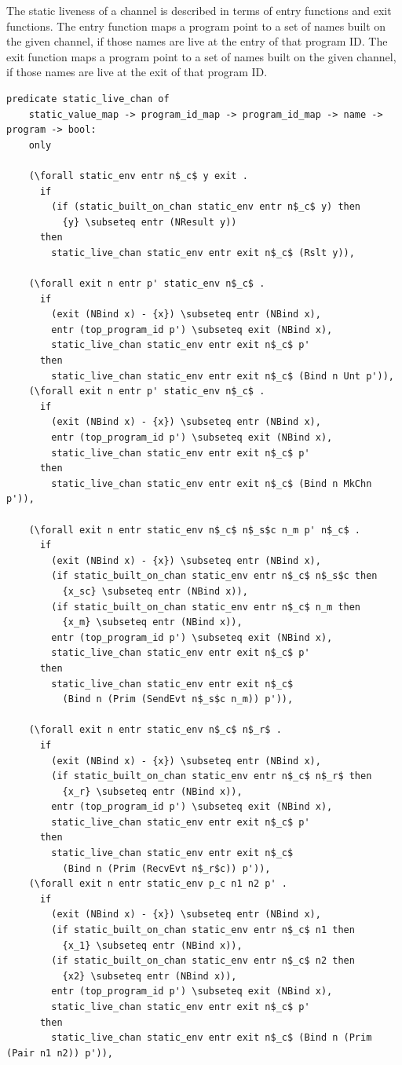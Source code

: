 \documentclass[10pt]{article}
\begin{document}
The static liveness of a channel is described in terms of entry functions and
exit functions. The entry function maps a program point to a set of names built on
the given channel, if those names are live at the entry of that program ID.
The exit function maps a program point to a
set of names built on the given channel, if those names are live at the exit of that
program ID.

\begin{lstlisting}[language=logic, mathescape]
  predicate static_live_chan of
    static_value_map -> program_id_map -> program_id_map -> name -> program -> bool:
    only

    (\forall static_env entr n$_c$ y exit .
      if
        (if (static_built_on_chan static_env entr n$_c$ y) then
          {y} \subseteq entr (NResult y))
      then
        static_live_chan static_env entr exit n$_c$ (Rslt y)),

    (\forall exit n entr p' static_env n$_c$ .
      if 
        (exit (NBind x) - {x}) \subseteq entr (NBind x),
        entr (top_program_id p') \subseteq exit (NBind x),
        static_live_chan static_env entr exit n$_c$ p'
      then 
        static_live_chan static_env entr exit n$_c$ (Bind n Unt p')),
    (\forall exit n entr p' static_env n$_c$ .
      if
        (exit (NBind x) - {x}) \subseteq entr (NBind x),
        entr (top_program_id p') \subseteq exit (NBind x),
        static_live_chan static_env entr exit n$_c$ p'
      then 
        static_live_chan static_env entr exit n$_c$ (Bind n MkChn p')),

    (\forall exit n entr static_env n$_c$ n$_s$c n_m p' n$_c$ .
      if
        (exit (NBind x) - {x}) \subseteq entr (NBind x),
        (if static_built_on_chan static_env entr n$_c$ n$_s$c then
          {x_sc} \subseteq entr (NBind x)),
        (if static_built_on_chan static_env entr n$_c$ n_m then 
          {x_m} \subseteq entr (NBind x)),
        entr (top_program_id p') \subseteq exit (NBind x),
        static_live_chan static_env entr exit n$_c$ p'
      then
        static_live_chan static_env entr exit n$_c$
          (Bind n (Prim (SendEvt n$_s$c n_m)) p')),

    (\forall exit n entr static_env n$_c$ n$_r$ .    
      if
        (exit (NBind x) - {x}) \subseteq entr (NBind x),
        (if static_built_on_chan static_env entr n$_c$ n$_r$ then
          {x_r} \subseteq entr (NBind x)),
        entr (top_program_id p') \subseteq exit (NBind x),
        static_live_chan static_env entr exit n$_c$ p'
      then
        static_live_chan static_env entr exit n$_c$
          (Bind n (Prim (RecvEvt n$_r$c)) p')),
    (\forall exit n entr static_env p_c n1 n2 p' .
      if
        (exit (NBind x) - {x}) \subseteq entr (NBind x),
        (if static_built_on_chan static_env entr n$_c$ n1 then
          {x_1} \subseteq entr (NBind x)),
        (if static_built_on_chan static_env entr n$_c$ n2 then
          {x2} \subseteq entr (NBind x)),
        entr (top_program_id p') \subseteq exit (NBind x),
        static_live_chan static_env entr exit n$_c$ p'
      then
        static_live_chan static_env entr exit n$_c$ (Bind n (Prim (Pair n1 n2)) p')),


\end{lstlisting}
\end{document}
